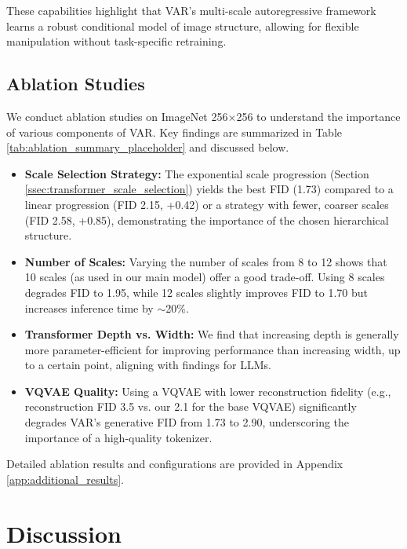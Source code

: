 \documentclass{article}
\begin{document}
These capabilities highlight that VAR's multi-scale autoregressive framework learns a robust conditional model of image structure, allowing for flexible manipulation without task-specific retraining.

\subsection{Ablation Studies}
\label{ssec:ablation}

We conduct ablation studies on ImageNet 256$\times$256 to understand the importance of various components of VAR. Key findings are summarized in Table \ref{tab:ablation_summary_placeholder} and discussed below.
\begin{itemize}[leftmargin=*,itemsep=1pt,topsep=2pt]
    \item \textbf{Scale Selection Strategy:} The exponential scale progression (Section \ref{ssec:transformer_scale_selection}) yields the best FID (1.73) compared to a linear progression (FID 2.15, +0.42) or a strategy with fewer, coarser scales (FID 2.58, +0.85), demonstrating the importance of the chosen hierarchical structure.
    \item \textbf{Number of Scales:} Varying the number of scales from 8 to 12 shows that 10 scales (as used in our main model) offer a good trade-off. Using 8 scales degrades FID to 1.95, while 12 scales slightly improves FID to 1.70 but increases inference time by $\sim$20\%.
    \item \textbf{Transformer Depth vs. Width:} We find that increasing depth is generally more parameter-efficient for improving performance than increasing width, up to a certain point, aligning with findings for LLMs.
    \item \textbf{VQVAE Quality:} Using a VQVAE with lower reconstruction fidelity (e.g., reconstruction FID 3.5 vs. our 2.1 for the base VQVAE) significantly degrades VAR's generative FID from 1.73 to 2.90, underscoring the importance of a high-quality tokenizer.
\end{itemize}
Detailed ablation results and configurations are provided in Appendix \ref{app:additional_results}.

\section{Discussion}
\label{sec:discussion}
\end{document}
